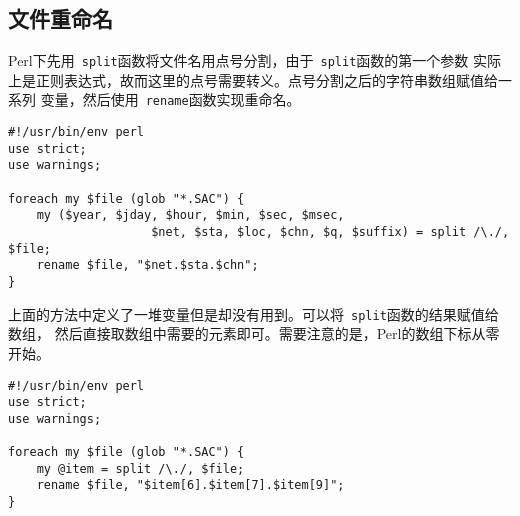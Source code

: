 \subsection{文件重命名}
\label{subsec:rename-in-perl}
Perl下先用~\verb+split+函数将文件名用点号分割，由于~\verb+split+函数的第一个参数
实际上是正则表达式，故而这里的点号需要转义。点号分割之后的字符串数组赋值给一系列
变量，然后使用~\verb+rename+函数实现重命名。
\begin{verbatim}
#!/usr/bin/env perl
use strict;
use warnings;

foreach my $file (glob "*.SAC") {
    my ($year, $jday, $hour, $min, $sec, $msec,
                    $net, $sta, $loc, $chn, $q, $suffix) = split /\./, $file;
    rename $file, "$net.$sta.$chn";
}
\end{verbatim}

上面的方法中定义了一堆变量但是却没有用到。可以将~\verb+split+函数的结果赋值给数组，
然后直接取数组中需要的元素即可。需要注意的是，Perl的数组下标从零开始。
\begin{verbatim}
#!/usr/bin/env perl
use strict;
use warnings;

foreach my $file (glob "*.SAC") {
    my @item = split /\./, $file;
    rename $file, "$item[6].$item[7].$item[9]";
}
\end{verbatim}
